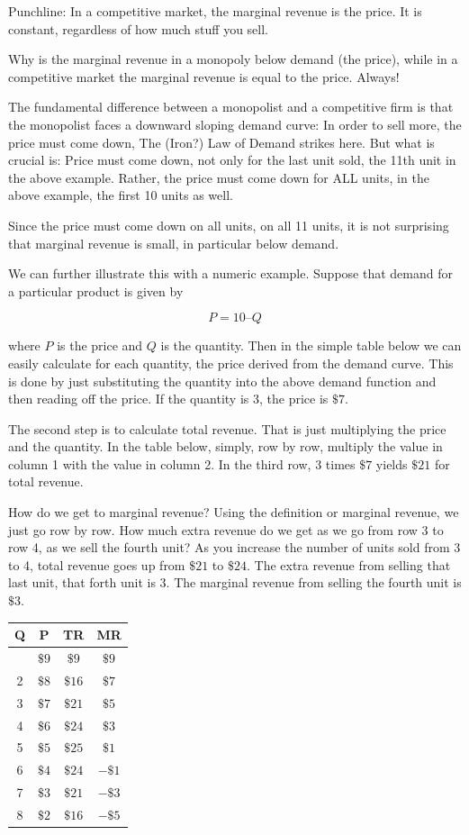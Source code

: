 \documentclass[
]{book}
\begin{document}
Punchline: In a competitive market, the marginal revenue is the price. It is constant, regardless of how much stuff you sell.

Why is the marginal revenue in a monopoly below demand (the price), while in a competitive market the marginal revenue is equal to the price. Always!

The fundamental difference between a monopolist and a competitive firm is that the monopolist faces a downward sloping demand curve: In order to sell more, the price must come down, The (Iron?) Law of Demand strikes here. But what is crucial is: Price must come down, not only for the last unit sold, the 11th unit in the above example. Rather, the price must come down for ALL units, in the above example, the first 10 units as well.

Since the price must come down on all units, on all 11 units, it is not surprising that marginal revenue is small, in particular below demand.

We can further illustrate this with a numeric example. Suppose that demand for a particular product is given by

\[P =  10 – Q\]

where \(P\) is the price and \(Q\) is the quantity. Then in the simple table below we can easily calculate for each quantity, the price derived from the demand curve. This is done by just substituting the quantity into the above demand function and then reading off the price. If the quantity is 3, the price is \(\$7\).

The second step is to calculate total revenue. That is just multiplying the price and the quantity. In the table below, simply, row by row, multiply the value in column 1 with the value in column 2. In the third row, 3 times \(\$7\) yields \(\$21\) for total revenue.

How do we get to marginal revenue? Using the definition or marginal revenue, we just go row by row. How much extra revenue do we get as we go from row 3 to row 4, as we sell the fourth unit? As you increase the number of units sold from 3 to 4, total revenue goes up from \(\$21\) to \(\$24\). The extra revenue from selling that last unit, that forth unit is 3. The marginal revenue from selling the fourth unit is \(\$3\).

\begin{longtable}[]{@{}cccc@{}}
\toprule\noalign{}
Q & P & TR & MR \\
\midrule\noalign{}
\endhead
\bottomrule\noalign{}
\endlastfoot
1 & \(\$9\) & \(\$9\) & \(\$9\) \\
2 & \(\$8\) & \(\$16\) & \(\$7\) \\
3 & \(\$7\) & \(\$21\) & \(\$5\) \\
4 & \(\$6\) & \(\$24\) & \(\$3\) \\
5 & \(\$5\) & \(\$25\) & \(\$1\) \\
6 & \(\$4\) & \(\$24\) & \(-\$1\) \\
7 & \(\$3\) & \(\$21\) & \(-\$3\) \\
8 & \(\$2\) & \(\$16\) & \(-\$5\) \\
\end{longtable}
\end{document}
